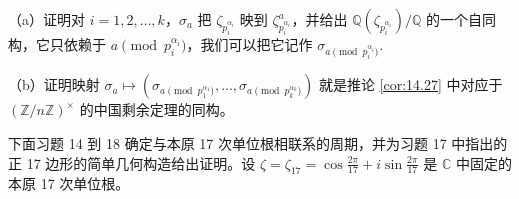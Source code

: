 \begin{enumerate}
（a）证明对 \(i = 1, 2, \ldots, k\)，\(\sigma_a\) 把 \(\zeta_{p_i^{\alpha_i}}\) 映到 \(\zeta_{p_i^{\alpha_i}}^a\)，并给出 \(\mathbb{Q}(\zeta_{p_i^{\alpha_i}})/\mathbb{Q}\) 的一个自同构，它只依赖于 \(a \pmod{p_i^{\alpha_i}}\)，我们可以把它记作 \(\sigma_{a \pmod{p_i^{\alpha_i}}}\).

（b）证明映射 \(\sigma_a \mapsto (\sigma_{a \pmod{p_1^{\alpha_1}}}, \ldots, \sigma_{a \pmod{p_k^{\alpha_k}}})\) 就是推论 \ref{cor:14.27} 中对应于 \((\mathbb{Z}/n\mathbb{Z})^\times\) 的中国剩余定理的同构。
\end{enumerate}

\noindent 下面习题 14 到 18 确定与本原 17 次单位根相联系的周期，并为习题 17 中指出的正 17 边形的简单几何构造给出证明。设 \(\zeta = \zeta_{17} = \cos\frac{2\pi}{17}+i\sin\frac{2\pi}{17}\) 是 \(\mathbb{C}\) 中固定的本原 17 次单位根。

